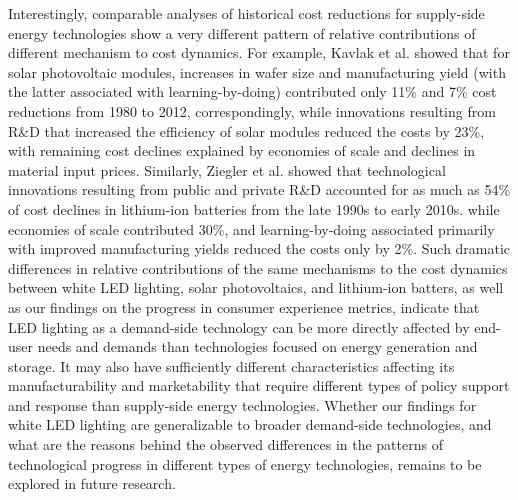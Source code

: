 \documentclass[parskip=full]{article}
\begin{document}
Interestingly, comparable analyses of historical cost reductions for supply-side energy technologies show a very different pattern of relative contributions of different mechanism to cost dynamics. For example, Kavlak et al.\cite{kavlak2018evaluating} showed that for solar photovoltaic modules, increases in wafer size and manufacturing yield (with the latter associated with learning-by-doing) contributed only 11\% and 7\% cost reductions from 1980 to 2012, correspondingly, while innovations resulting from R\&D that increased the efficiency of solar modules reduced the costs by 23\%, with remaining cost declines explained by economies of scale and declines in material input prices. Similarly, Ziegler et al.\cite{Ziegler2021} showed that technological innovations resulting from public and private R\&D accounted for as much as 54\% of cost declines in lithium-ion batteries from the late 1990s to early 2010s. while economies of scale contributed 30\%, and learning-by-doing associated primarily with improved manufacturing yields reduced the costs only by 2\%. Such dramatic differences in relative contributions of the same mechanisms to the cost dynamics between white LED lighting, solar photovoltaics, and lithium-ion batters, as well as our findings on the progress in consumer experience metrics, indicate that LED lighting as a demand-side technology can be more directly affected by end-user needs and demands than technologies focused on energy generation and storage. It may also have sufficiently different characteristics affecting its manufacturability and marketability that require different types of policy support and response than supply-side energy technologies. Whether our findings for white LED lighting are generalizable to broader demand-side technologies, and what are the reasons behind the observed differences in the patterns of technological progress in different types of energy technologies, remains to be explored in future research. 
\end{document}
